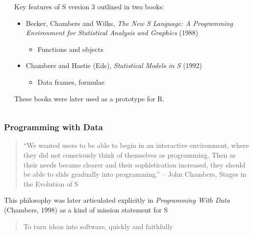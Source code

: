 \documentclass[svgnames]{beamer}
\begin{document}
\begin{frame}
\begin{columns}
\begin{column}{2cm}
    \end{column}
    \begin{column}{8cm}
      Key features of S version 3 outlined in two books:
      \begin{itemize}
        \item Becker, Chambers and Wilks, {\em The New S Language: A
          Programming Environment for Statistical Analysis and
          Graphics} (1988)
          \begin{itemize}
          \item Functions and objects
          \end{itemize}
        \item Chambers and Hastie (Eds), {\em Statistical Models in S} (1992)
          \begin{itemize}
          \item Data frames, formulae
          \end{itemize}
      \end{itemize}
      These books were later used as a prototype for R.
    \end{column}
  \end{columns}

\end{frame}

\begin{frame}
  \frametitle{Programming with Data}

  \begin{quote}
  ``We wanted users to be able to begin in an interactive environment,
  where they did not consciously think of themselves as programming. Then
  as their needs became clearer and their sophistication increased, they
  should be able to slide gradually into programming.''
  -- John Chambers, Stages in the Evolution of S
  \end{quote}

  This philosophy was later articulated explicitly in {\em Programming
    With Data} (Chambers, 1998) as a kind of mission statement for S

  \begin{quote}
    To turn ideas into software, quickly and faithfully
  \end{quote}
  
\end{frame}
\end{document}
